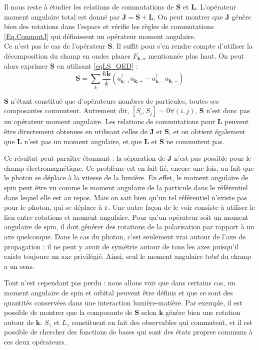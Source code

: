 Il nous reste à étudier les relations de commutations de $\bm{S}$ et $\bm{L}$. L'opérateur moment angulaire total est donné par $\bm{J} = \bm{S}+\bm{L}$. On peut montrer  que $\bm{J}$ génère bien des rotations dans l'espace et vérifie les règles de commutations \ref{Eq.CommutJ} qui définissent un opérateur moment angulaire.\\
Ce n'est pas le cas de l'opérateur $\bm{S}$. Il suffit pour s'en rendre compte d'utiliser la décomposition du champ en ondes planes $F_{\bm{k},\alpha}$ mentionnée plus haut. On peut alors exprimer $\bm{S}$ en utilisant \ref{eqLS_QED} :
\begin{equation}
\bm{S} = \sum_k{\frac{\hbar\bm{k}}{k}(a^{\dag}_{\bm{k},+}a_{\bm{k},+}-a^{\dag}_{\bm{k},-}a_{\bm{k},-})}
\label{eqS_planewave}
\end{equation}

$\bm{S}$ n'étant constitué que d'opérateurs nombres de particules, toutes ses composantes commutent. Autrement dit, $[S_i,S_j] = 0 \forall(i,j)$, $\bm{S}$ n'est donc pas un opérateur moment angulaire. Les relations de commutations pour $\bm{L}$ peuvent être directement obtenues en utilisant celles de $\bm{J}$ et $\bm{S}$, et on obtient également que $\bm{L}$ n'est pas un moment angulaire, et que $\bm{L}$ et $\bm{S}$ ne commutent pas. 

Ce résultat peut paraître étonnant : la séparation de $\bm{J}$ n'est pas possible pour le champ électromagnétique. Ce problème est en fait lié, encore une fois, au fait que le photon se déplace à la vitesse de la lumière. En effet, le moment angulaire de spin peut être vu comme le moment angulaire de la particule dans le référentiel dans lequel elle est au repos. Mais on sait bien qu'un tel référentiel n'existe pas pour le photon, qui se déplace à $\mathrm{c}$. Une autre façon de le voir consiste à utiliser le lien entre rotations et moment angulaire. Pour qu'un opérateur soit un moment angulaire de spin, il doit générer des rotations de la polarisation par rapport à un axe quelconque. Dans le cas du photon, c'est seulement vrai autour de l'axe de propagation : il ne peut y avoir de symétrie autour de tous les axes puisqu'il existe toujours un axe privilégié. Ainsi, seul le moment angulaire \textit{total} du champ a un sens.

Tout n'est cependant pas perdu : nous allons voir que dans certains cas, un moment angulaire de spin et orbital peuvent être définis et que ce sont des quantités conservées dans une interaction lumière-matière. Par exemple, il est possible de montrer  que la composante de $\bm{S}$ selon $\bm{k}$ génère bien une rotation autour de $\bm{k}$. $S_z$ et $L_z$ constituent en fait des observables qui commutent, et il est possible de chercher des fonctions de bases qui sont des états propres communs à ces deux opérateurs.

